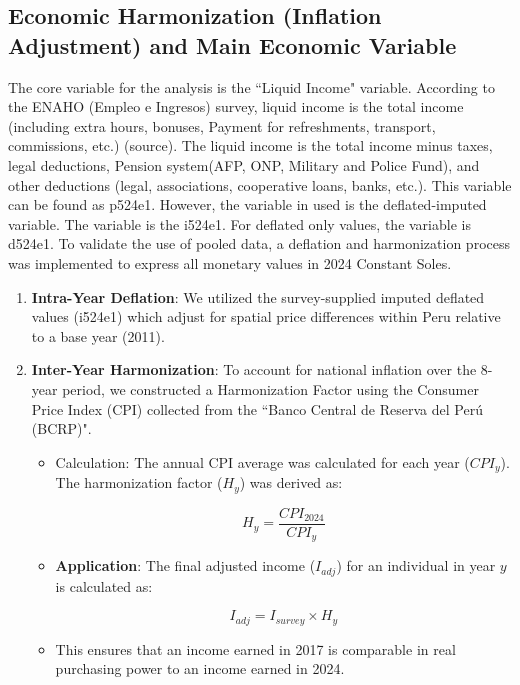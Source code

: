 \documentclass{article}
\begin{document}
\subsection{Economic Harmonization (Inflation Adjustment) and Main Economic Variable}
The core variable for the analysis is the ``Liquid Income" variable. According to the ENAHO (Empleo 
e Ingresos) survey, liquid income is the total income (including extra hours, bonuses, Payment for 
refreshments, transport, commissions, etc.) (source). The liquid income is the total income minus 
taxes, legal deductions, Pension system(AFP, ONP, Military and Police Fund), and other deductions 
(legal, associations, cooperative loans, banks, etc.). This variable can be found as p524e1. 
However, the variable in used is the deflated-imputed variable. The variable is the i524e1. For 
deflated only values, the variable is d524e1. 
To validate the use of pooled data, a deflation and harmonization process was implemented to 
express all monetary values in 2024 Constant Soles.

\begin{enumerate}

    \item \textbf{Intra-Year Deflation}: We utilized the 
    survey-supplied imputed deflated values (i524e1) 
    which adjust for spatial price differences within 
    Peru relative to a base year (2011).

    \item \textbf{Inter-Year Harmonization}: To account 
    for national inflation over the 8-year period, we 
    constructed a Harmonization Factor using the Consumer 
    Price Index (CPI) collected from the ``Banco Central 
    de Reserva del Perú (BCRP)". 

        \begin{itemize}
            
            \item Calculation: The annual CPI average 
            was calculated for each year ($CPI_y$). 
            The harmonization factor ($H_y$) was 
            derived as:

            \begin{equation*}
                H_y=\frac{CPI_{2024}}{CPI_y}
            \end{equation*}

            \item \textbf{Application}: The final 
            adjusted income ($I_{adj}$) for an 
            individual in year $y$ is calculated as:

            \begin{equation*}
                I_{adj} = I_{survey} \times H_y
            \end{equation*}

            \item This ensures that an income 
            earned in 2017 is comparable in 
            real purchasing power to an income 
            earned in 2024. 

        \end{itemize}

\end{enumerate}
\end{document}
